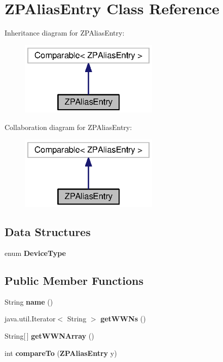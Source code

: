\section{Z\+P\+Alias\+Entry Class Reference}
\label{classorg_1_1smallfoot_1_1parser_1_1zone_1_1ZPAliasEntry}


Inheritance diagram for Z\+P\+Alias\+Entry\+:\nopagebreak
\begin{figure}[H]
\begin{center}
\leavevmode
\includegraphics[width=188pt]{classorg_1_1smallfoot_1_1parser_1_1zone_1_1ZPAliasEntry__inherit__graph}
\end{center}
\end{figure}


Collaboration diagram for Z\+P\+Alias\+Entry\+:\nopagebreak
\begin{figure}[H]
\begin{center}
\leavevmode
\includegraphics[width=188pt]{classorg_1_1smallfoot_1_1parser_1_1zone_1_1ZPAliasEntry__coll__graph}
\end{center}
\end{figure}
\subsection*{Data Structures}
\begin{DoxyCompactItemize}
\item 
enum {\bf Device\+Type}
\end{DoxyCompactItemize}
\subsection*{Public Member Functions}
\begin{DoxyCompactItemize}
\item 
String {\bf name} ()
\item 
java.\+util.\+Iterator$<$ String $>$ {\bf get\+W\+W\+Ns} ()
\item 
String[$\,$] {\bf get\+W\+W\+N\+Array} ()
\item 
int {\bf compare\+To} ({\bf Z\+P\+Alias\+Entry} y)
\end{DoxyCompactItemize}


